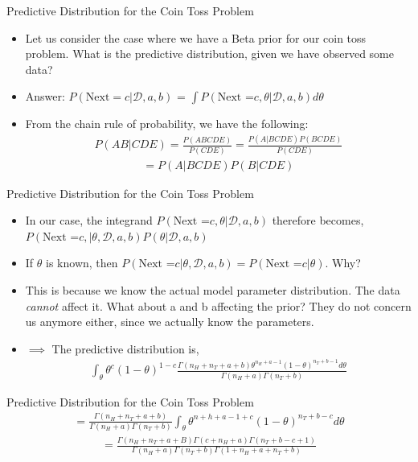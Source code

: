 \documentclass{beamer}
\begin{document}
\begin{frame}{Predictive Distribution for the Coin Toss Problem}

\begin{itemize}
	
	\item Let us consider the case where we have a Beta prior for our coin toss problem. What is the predictive distribution, given we have observed some data?
	\item Answer: $P(\text{Next} = c | \mathcal{D}, a, b )$ = $\int P(\text{Next =}c, \theta | \mathcal{D}, a, b)d\theta$
	\item From the chain rule of probability, we have the following:
	\begin{align*}
	    P(AB|CDE) = \frac{P(ABCDE)}{P(CDE)} = \frac{P(A|BCDE)P(BCDE)}{P(CDE)}
	\end{align*}
	\begin{align*}
	    = P(A|BCDE)P(B|CDE)
	\end{align*}
	
	
\end{itemize}
\end{frame}

\begin{frame}{Predictive Distribution for the Coin Toss Problem}

\begin{itemize}
	
	\item In our case, the integrand $P(\text{Next =}c, \theta |  \mathcal{D}, a, b)$ therefore becomes, $ P(\text{Next =}c, | \theta,  \mathcal{D}, a, b)P(\theta|\mathcal{D}, a, b)$
	\item If $\theta$ is known, then $P(\text{Next =}c | \theta,  \mathcal{D}, a, b) = P(\text{Next =}c | \theta)$. Why? 
	\item This is because we know the actual model parameter distribution. The data \emph{cannot} affect it. What about a and b affecting the prior? They do not concern us anymore either, since we actually know the parameters. 
	\item $\implies$ The predictive distribution is, 
	\begin{align*}
	    \int_\theta \theta^c(1 - \theta)^{1-c}\frac{\Gamma(n_H + n_T + a + b)\theta^{n_H + a - 1}(1 - \theta)^{n_T + b - 1}d\theta}{\Gamma(n_H + a)\Gamma(n_T + b)}
	\end{align*}
	
	
\end{itemize}
\end{frame}
\begin{frame}{Predictive Distribution for the Coin Toss Problem}
\begin{align*}
     = \frac{\Gamma(n_H + n_T + a + b)}{\Gamma(n_H + a)\Gamma(n_T + b)}\int_\theta \theta^{n+h + a - 1 + c}(1 - \theta)^{n_T + b - c}d\theta
\end{align*}
\begin{align*}
   =   \frac{\Gamma(n_H + n_T + a + B)\Gamma(c + n_H + a)\Gamma(n_T + b - c + 1)}{\Gamma(n_H + a)\Gamma(n_T + b)\Gamma(1 + n_H + a + n_T + b)}
\end{align*}
    
\end{frame}
\end{document}

